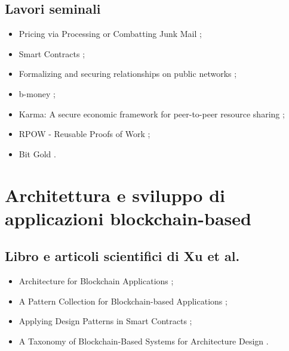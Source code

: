 \subsection*{Lavori seminali}
\begin{itemize}

\item Pricing via Processing or Combatting Junk Mail \cite{dwork1993proofofwork};

\item Smart Contracts \cite{szabo1994smartcontracts};

\item Formalizing and securing relationships on public networks \cite{szabo1997smartcontracts};

\item b-money \cite{dai1997cryptocurrency};

\item Karma: A secure economic framework for peer-to-peer resource sharing \cite{vishnumurthy2003proofofwork};

\item RPOW - Reusable Proofs of Work \cite{finney2004proofofwork};

\item Bit Gold \cite{szabo2005cryptocurrency}.

\end{itemize}

\section*{Architettura e sviluppo di applicazioni blockchain-based}

\subsection*{Libro e articoli scientifici di Xu et al.}
\begin{itemize}

\item Architecture for Blockchain Applications \cite{xu2019book};

\item A Pattern Collection for Blockchain-based Applications \cite{xu2018patterns};

\item Applying Design Patterns in Smart Contracts \cite{xu2018design};

\item A Taxonomy of Blockchain-Based Systems for Architecture Design \cite{xu2017architecture}.

\end{itemize}

